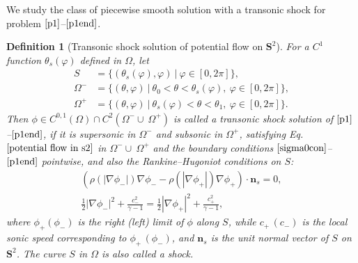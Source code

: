 \documentclass[reqno,12pt]{amsart}
\newtheorem{definition}{Definition}[section]
\numberwithin{equation}{section}
\begin{document}
We study the class of piecewise smooth solution with a transonic shock for problem $\eqref{p1}$--$\eqref{p1end}$.
\begin{definition}[Transonic shock solution of potential flow on $\mathbf{S}^2$]\label{tss}
	For a $C^1$ function $\theta_s(\varphi)$ defined in $\Omega$, let		
	\begin{align*}
		S&=\{(\theta_s(\varphi),\varphi)~|~\varphi\in[0,2\pi]\},\\
		\Omega^-&=\{(\theta,\varphi)~|~\theta_0<\theta<\theta_s(\varphi),~\varphi\in[0,2\pi]\},\\
		\Omega^+&=\{(\theta,\varphi)~|~\theta_s(\varphi)<\theta<\theta_1,~\varphi\in[0,2\pi]\}.
	\end{align*}
Then $\phi\in C^{0,1}(\Omega) \cap C^2(\Omega^-\cup~\Omega^+)$ is  called a transonic shock solution of $\eqref{p1}$--$\eqref{p1end}$, if it is supersonic in $\Omega^-$ and subsonic in $\Omega^+$, satisfying Eq.$\eqref{potential flow in s2}$ in $\Omega^-\cup~\Omega^+$ and the boundary conditions $\eqref{sigma0con}$--$\eqref{p1end}$ pointwise, and also the Rankine–Hugoniot conditions on $S$:
	\begin{align}
		(\rho(|\nabla \phi_-|)\nabla \phi_--\rho(|\nabla \phi_+|)\nabla \phi_+)\cdot \mathbf{n}_s=0,\label{rh1}\\
		\frac{1}{2}|\nabla \phi_-|^2+\frac{c^2_-}{\gamma-1}=\frac{1}{2}|\nabla \phi_+|^2+\frac{c^2_+}{\gamma-1},\label{rh2}
	\end{align}
	where $\phi_+(\phi_-)$ is the right (left) limit of $\phi$ along $S$, while $c_+\, (c_-)$ is the local sonic speed corresponding to  $\phi_+\, (\phi_-)$, and $\mathbf{n}_s$ is the unit normal vector of $S$ on $\mathbf{S}^2$. The curve $S$ in $\Omega$
	is also called a shock.
	\end{definition}
\end{document}
